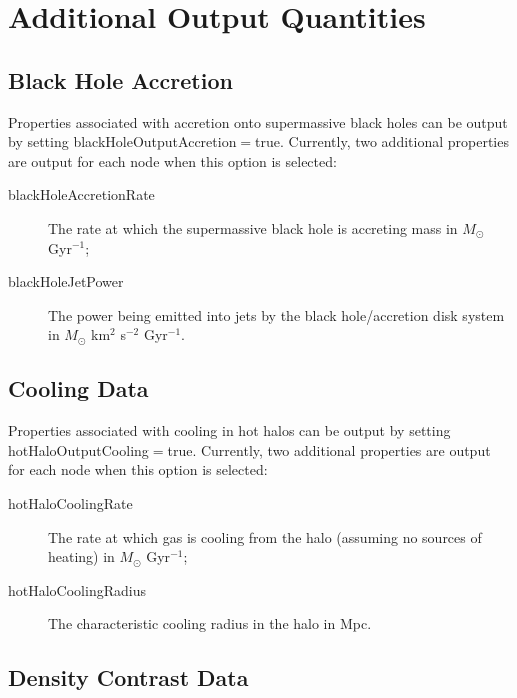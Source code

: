 \chapter{Additional Output Quantities}

\section{Black Hole Accretion}

Properties associated with accretion onto supermassive black holes can be output by setting {\normalfont \ttfamily blackHoleOutputAccretion}$=${\normalfont \ttfamily true}. Currently, two additional properties are output for each node when this option is selected:
\begin{description}
\item[{\normalfont \ttfamily blackHoleAccretionRate}] The rate at which the supermassive black hole is accreting mass in $M_\odot$ Gyr$^{-1}$;
\item[{\normalfont \ttfamily blackHoleJetPower}] The power being emitted into jets by the black hole/accretion disk system in $M_\odot$ km$^2$ s$^{-2}$ Gyr$^{-1}$.
\end{description}

\section{Cooling Data}

Properties associated with cooling in hot halos can be output by setting {\normalfont \ttfamily hotHaloOutputCooling}$=${\normalfont \ttfamily true}. Currently, two additional properties are output for each node when this option is selected:
\begin{description}
\item[{\normalfont \ttfamily hotHaloCoolingRate}] The rate at which gas is cooling from the halo (assuming no sources of heating) in $M_\odot$ Gyr$^{-1}$;
\item[{\normalfont \ttfamily hotHaloCoolingRadius}] The characteristic cooling radius in the halo in Mpc.
\end{description}

\section{Density Contrast Data}

